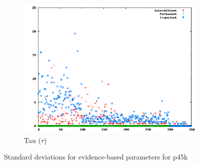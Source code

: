 \begin{figure}
\begin{subfigure}[h]{0.45\linewidth}
                \includegraphics[scale=0.25]{figures/sdtaup45k.png}
                \caption{Tau ($\tau$)}
        \end{subfigure}
        \caption{Standard deviations for evidence-based parameters for p45k}
        \label{fig:sdevidance} 
\end{figure}
